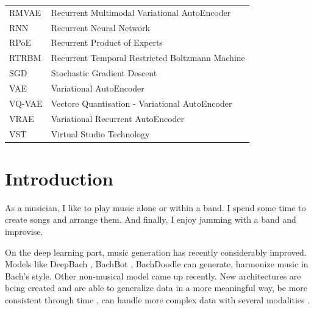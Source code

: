 \documentclass[12pt]{report}
\begin{document}
\begin{center}
\begin{longtable}{ll}
        RMVAE & Recurrent Multimodal Variational AutoEncoder \\
        RNN & Recurrent Neural Network \\
        RPoE & Recurrent Product of Experts \\
        RTRBM & Recurrent Temporal Restricted Boltzmann Machine \\
        SGD & Stochastic Gradient Descent \\
        VAE & Variational AutoEncoder \\
        VQ-VAE & Vectore Quantisation - Variational AutoEncoder \\
        VRAE & Variational Recurrent AutoEncoder \\
        VST & Virtual Studio Technology
    \end{longtable}
    
\end{center}
\newpage




\chapter{Introduction}

As a musician, I like to play music alone or within a band.
I spend some time to create songs and arrange them. And finally, I enjoy jamming with a band and improvise.

On the deep learning part, music generation has recently considerably improved.
Models like DeepBach \cite{hadjeres_deepbach:_2016}, BachBot \cite{liang_automatic_2017}, BachDoodle \cite{huang_bach_2019} can generate, harmonize music in Bach's style.
Other non-musical model came up recently.
New architectures are being created and are able to generalize data in a more meaningful way, be more consistent through time \cite{vaswani_attention_2017}, can handle more complex data with several modalities \cite{wu_multimodal_2018-1, tan_factorized_2019}.
\end{document}

